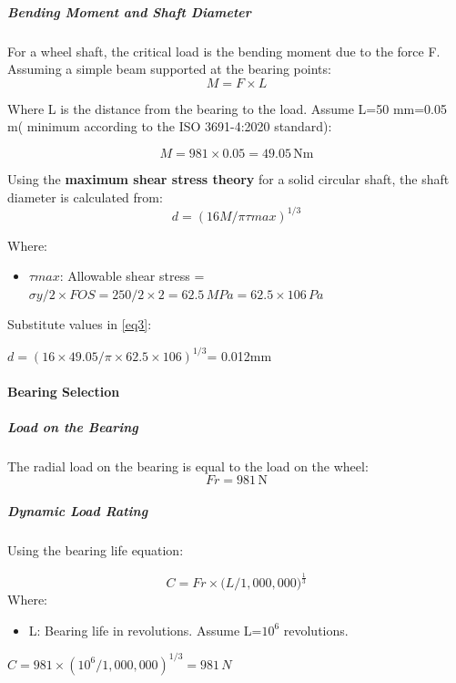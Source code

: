 \documentclass[../../main]{subfiles}
\begin{document}
\subparagraph{Bending Moment and Shaft Diameter}

For a wheel shaft, the critical load is the bending moment due to the
force F. Assuming a simple beam supported at the bearing points:
\begin{equation}
  M = F \times L
\label{eq2}
\end{equation}

Where L is the distance from the bearing to the load. Assume
L=50 mm=0.05 \\m( minimum according to the ISO 3691-4:2020 standard):

$$ M = 981 \times 0.05 = 49.05\, \text{Nm}$$

Using the \textbf{maximum shear stress theory} for a solid circular
shaft, the shaft diameter is calculated from:
\begin{equation}  
 d = (16M/\pi\tau max)^{1/3} 
 \label{eq3}
\end{equation}

Where:

\begin{itemize}
\item
  \(\tau max\): Allowable shear stress =
  \(\sigma y/2 \times FOS = 250/2 \times 2 = 62.5\, MPa = 62.5 \times 106\, Pa\)
\end{itemize}

Substitute values in \cref{eq3}:

\(d = (16 \times 49.05/\pi \times 62.5 \times 106)^{1/3}\)= 0.012mm

\paragraph{Bearing Selection}

\subparagraph{ Load on the Bearing}

The radial load on the bearing is equal to the load on the wheel:
$$Fr = 981\, \text{N}$$

\subparagraph{Dynamic Load Rating}

Using the bearing life equation:

$$C = Fr \times (L/1,000,00{0)}^{\frac{1}{3}}$$
Where:

\begin{itemize}
\item
  L: Bearing life in revolutions. Assume L=\(10^{6}\) revolutions.
\end{itemize}

\(C = 981 \times (10^{6}/1,000,000)^{1/3} = 981\, N\)
\end{document}
